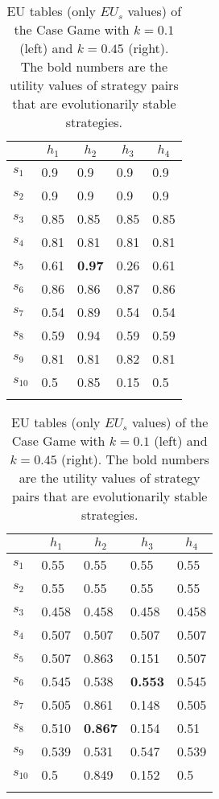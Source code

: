 \documentclass[output=paper,hidelinks]{langscibook}
\begin{document}
\begin{table}
\begin{subtable}{.5\textwidth}\centering
\caption{$k=0.1$}
\begin{tabular}{lllll} 
\lsptoprule
 & \multicolumn{1}{c}{$h_1$} & \multicolumn{1}{c}{$h_2$} & \multicolumn{1}{c}{$h_3$} & \multicolumn{1}{c}{$h_4$}  \\\midrule
$s_1$ & 0.9  &  0.9  & 0.9 & 0.9  \\
$s_2$ & 0.9  &  0.9  & 0.9 & 0.9  \\
$s_3$ & 0.85  &  0.85  & 0.85 & 0.85  \\
$s_4$ & 0.81  &  0.81  & 0.81 & 0.81  \\
$s_5$ & 0.61  &  \textbf{0.97}  & 0.26 & 0.61  \\
$s_6$ & 0.86  &  0.86  & 0.87 & 0.86  \\
$s_7$ & 0.54  &  0.89  & 0.54 & 0.54  \\
$s_8$ & 0.59  &  0.94  & 0.59 & 0.59  \\
$s_9$ & 0.81  &  0.81  & 0.82 & 0.81  \\
$s_{10}$ & 0.5  &  0.85  & 0.15 & 0.5  \\\lspbottomrule
\end{tabular}
\end{subtable}\begin{subtable}{.5\textwidth}\centering
\caption{$k=0.45$}
\begin{tabular}{lllll} 
\lsptoprule
 & \multicolumn{1}{c}{$h_1$} & \multicolumn{1}{c}{$h_2$} & \multicolumn{1}{c}{$h_3$} & \multicolumn{1}{c}{$h_4$}  \\\midrule
$s_1$ & 0.55  &  0.55  & 0.55 & 0.55  \\
$s_2$ & 0.55  &  0.55  & 0.55 & 0.55  \\
$s_3$ & 0.458  &  0.458  & 0.458 & 0.458  \\
$s_4$ & 0.507  &  0.507  & 0.507 & 0.507  \\
$s_5$ & 0.507  &  0.863  & 0.151 & 0.507  \\
$s_6$ & 0.545  &  0.538  & \textbf{0.553} & 0.545  \\
$s_7$ & 0.505  &  0.861  & 0.148 & 0.505  \\
$s_8$ & 0.510  &  \textbf{0.867}  & 0.154 & 0.51  \\
$s_9$ & 0.539  &  0.531  & 0.547 & 0.539  \\
$s_{10}$ & 0.5  &  0.849  & 0.152 & 0.5  \\\lspbottomrule
\end{tabular}
\end{subtable}
\caption{EU tables (only $EU_s$ values) of the Case Game with $k=0.1$ (left) and $k=0.45$ (right). The bold numbers are the utility values of strategy pairs that are evolutionarily stable strategies.\label{EU_Case}}
\end{table}
\end{document}
